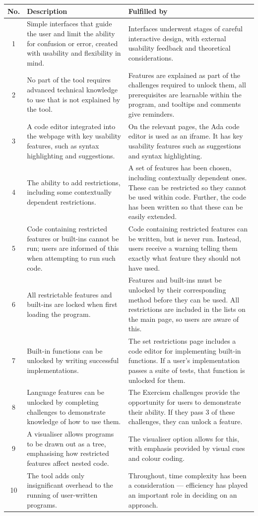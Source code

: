 \begin{longtable}{|c|p{7cm}|p{7cm}|}
\hline
\textbf{No.} & \textbf{Description} & \textbf{Fulfilled by} \\ \hline
1 & Simple interfaces that guide the user and limit the ability for confusion or error, created with usability and flexibility in mind. & Interfaces underwent stages of careful interactive design, with external usability feedback and theoretical considerations. \\ \hline
2 & No part of the tool requires advanced technical knowledge to use that is not explained by the tool. & Features are explained as part of the challenges required to unlock them, all prerequisites are learnable within the program, and tooltips and comments give reminders. \\ \hline
3 & A code editor integrated into the webpage with key usability features, such as syntax highlighting and suggestions. & On the relevant pages, the Ada code editor is used as an iframe. It has key usability features such as suggestions and syntax highlighting. \\ \hline
4 & The ability to add restrictions, including some contextually dependent restrictions. & A set of features has been chosen, including contextually dependent ones. These can be restricted so they cannot be used within code. Further, the code has been written so that these can be easily extended. \\ \hline
5 & Code containing restricted features or built-ins cannot be run; users are informed of this when attempting to run such code. & Code containing restricted features can be written, but is never run. Instead, users receive a warning telling them exactly what feature they should not have used. \\ \hline
6 & All restrictable features and built-ins are locked when first loading the program. & Features and built-ins must be unlocked by their corresponding method before they can be used. All restrictions are included in the lists on the main page, so users are aware of this. \\ \hline
7 & Built-in functions can be unlocked by writing successful implementations. & The set restrictions page includes a code editor for implementing built-in functions. If a user's implementation passes a suite of tests, that function is unlocked for them. \\ \hline
8 & Language features can be unlocked by completing challenges to demonstrate knowledge of how to use them. & The Exercism challenges provide the opportunity for users to demonstrate their ability. If they pass 3 of these challenges, they can unlock a feature.\\ \hline
9 & A visualiser allows programs to be drawn out as a tree, emphasising how restricted features affect nested code. & The visualiser option allows for this, with emphasis provided by visual cues and colour coding. \\ \hline
10 & The tool adds only insignificant overhead to the running of user-written programs. & Throughout, time complexity has been a consideration --- efficiency has played an important role in deciding on an approach. \\ \hline
\end{longtable}